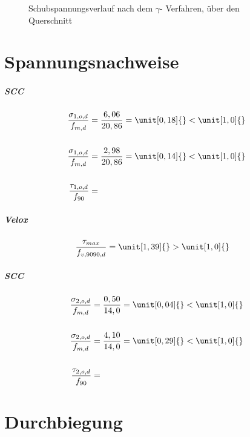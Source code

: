 \begin{figure}
\begin{center}
\caption{Schubspannungsverlauf nach dem $\gamma$- Verfahren, über den Querschnitt}
\label{schubspannung}
\end{center}
\end{figure}


\section{Spannungsnachweise}

\subparagraph{SCC}

\begin{align*}
\dfrac{\sigma_{1,o,d}}{f_{m,d}}&=\dfrac{6,06}{20,86}=\unit[0,18]{} < \unit[1,0]{}\\\\
\dfrac{\sigma_{1,o,d}}{f_{m,d}}&=\dfrac{2,98}{20,86}=\unit[0,14]{} < \unit[1,0]{}\\\\
\dfrac{\tau_{1,o,d}}{f_{90}}&=
\end{align*}

\subparagraph{Velox}

\begin{align*}
\dfrac{\tau_{max}}{f_{v,9090,d}}&=\unit[1,39]{} > \unit[1,0]{}
\end{align*}
\subparagraph{SCC}

\begin{align*}
\dfrac{\sigma_{2,o,d}}{f_{m,d}}&=\dfrac{0,50}{14,0}=\unit[0,04]{} < \unit[1,0]{}\\\\
\dfrac{\sigma_{2,o,d}}{f_{m,d}}&=\dfrac{4,10}{14,0}=\unit[0,29]{} < \unit[1,0]{}\\\\
\dfrac{\tau_{2,o,d}}{f_{90}}&=
\end{align*}

\section{Durchbiegung}


